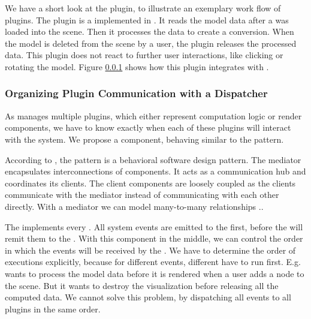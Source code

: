 \documentclass[../ClassicThesis.tex]{subfiles}
\begin{document}
We have a short look at the  plugin, to
illustrate an exemplary work flow of plugins. The
 plugin is a  implemented in
{\platener}. It reads the model data after a {\threedmodel} was
loaded into the scene. Then it processes the data to create a
{\lasercutter} conversion. When the model is deleted from the scene
by a user, the plugin releases the processed data. This plugin does
not react to further user interactions, like clicking or rotating
the model. Figure \ref{}  shows how this
plugin integrates with {\convertify}.

\subsubsection{Organizing Plugin Communication with a
  Dispatcher}


As {\convertify} manages multiple plugins, which either
represent computation logic or render components, we have to
know exactly when each of these plugins will interact with the
system. We propose a  component, behaving
similar to the  pattern.

According to \citeauthor{gof}, the  pattern is a
behavioral software design pattern. The mediator encapsulates
interconnections of components. It acts as a communication hub and
coordinates its clients. The client components are loosely coupled as
the clients communicate with the mediator instead of communicating
with each other directly. With a mediator we can model many-to-many
relationships \cite[p. ?]{gof}..

The  implements every . All system
events are emitted to the  first, before the
 will remit them to the . With this
component in the middle, we can control the order in which the events
will be received by the . We have to determine the
order of  executions explicitly, because for
different events, different  have to run first. E.g.
{\platener} wants to process the model data before it is rendered when
a user adds a node to the scene. But it wants to destroy the
visualization before releasing all the computed data. We cannot solve
this problem, by dispatching all events to all plugins in the same order.
\end{document}
